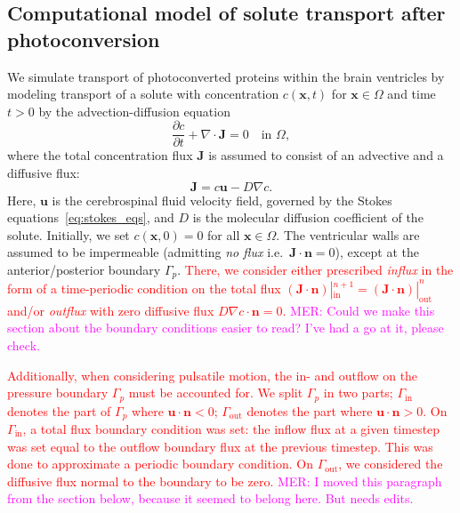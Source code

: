 \documentclass[fleqn]{wlscirep}
\newcommand{\pdifft}[1]{\frac{\partial  #1}{\partial t}}
\newcommand{\Gp}{\Gamma_{p}}
\newcommand{\Gin}{\Gamma_{\mathrm{in}}}
\newcommand{\Gout}{\Gamma_{\mathrm{out}}}
\newcommand{\nn}{\mathbf{n}}
\newcommand{\uu}{\mathbf{u}}
\newcommand{\xx}{\bm{x}}
\newcommand{\JJ}{\mathbf{J}}
\newcommand{\mer}[1]{\textcolor{magenta}{#1}}
\newcommand{\fixme}[1]{\textcolor{red}{#1}}
\begin{document}
\subsection*{Computational model of solute transport after photoconversion}
We simulate transport of photoconverted proteins within the brain ventricles by modeling transport of a solute with concentration $c(\xx, t)$ for $\xx\in\Omega$ and time $t > 0$ by the advection-diffusion equation
\begin{equation}
    \pdifft{c} + \nabla\cdot\JJ = 0 \quad \text{in } \Omega,
    \label{eq:adv_diff_strong}
\end{equation}
where the total concentration flux $\mathbf{J}$ is assumed to consist of an advective and a diffusive flux:
\begin{equation*}
    \JJ = c\uu - D\nabla c .
\end{equation*}
Here, $\uu$ is the cerebrospinal fluid velocity field, governed by the Stokes equations~\eqref{eq:stokes_eqs}, and $D$ is the molecular diffusion coefficient of the solute. Initially, we set $c(\xx, 0)=0$ for all $\xx\in\Omega$. The ventricular walls are assumed to be impermeable (admitting \emph{no flux} i.e.~$\JJ\cdot\nn=0$), except at the anterior/posterior boundary $\Gamma_p$. \fixme{There, we consider either prescribed \emph{influx} in the form of a time-periodic condition on the total flux $(\JJ\cdot\nn)|_{\mathrm{in}}^{n+1}=(\JJ\cdot\nn)|_{\mathrm{out}}^{n}$ and/or \emph{outflux} with zero diffusive flux $D\nabla c\cdot\nn=0$.}
\mer{MER: Could we make this section about the boundary conditions easier to read? I've had a go at it, please check.}

\fixme{Additionally, when considering pulsatile motion, the in- and outflow on the pressure boundary $\Gp$ must be accounted for. We split $\Gp$ in two parts; $\Gin$ denotes the part of $\Gp$ where $\uu\cdot\nn < 0$; $\Gout$ denotes the part where $\uu\cdot\nn > 0$. On $\Gin$, a total flux boundary condition was set: the inflow flux at a given timestep was set equal to the outflow boundary flux at the previous timestep. This was done to approximate a periodic boundary condition. On $\Gout$, we considered the diffusive flux normal to the boundary to be zero.}
\mer{MER: I moved this paragraph from the section below, because it seemed to belong here. But needs edits.} 

\end{document}
